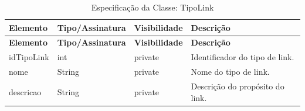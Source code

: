 \fonteautores

\vspace{\baselineskip}

\Needspace{0.32\textheight}
\begin{longtable}{|L{3.5cm}|L{3.5cm}|L{3.5cm}|L{3.5cm}|}
\caption{Especificação da Classe: TipoLink} \\
\hline
\textbf{Elemento} & \textbf{Tipo/Assinatura} & \textbf{Visibilidade} & \textbf{Descrição} \\
\hline
\endfirsthead
\hline
\textbf{Elemento} & \textbf{Tipo/Assinatura} & \textbf{Visibilidade} & \textbf{Descrição} \\
\hline
\endhead
idTipoLink & int & private & Identificador do tipo de link. \\
\hline
nome & String & private & Nome do tipo de link. \\
\hline
descricao & String & private & Descrição do propósito do link. \\
\hline
\end{longtable}

\fonteautores
